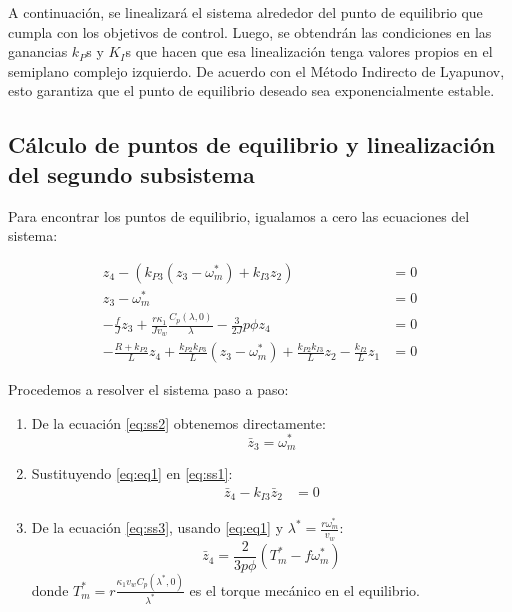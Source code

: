 {A continuación, se linealizará el sistema alrededor del punto de equilibrio que cumpla con los objetivos 
de control. Luego, se obtendrán las condiciones en las ganancias $k_{P}$s y $K_I$s que hacen que esa 
linealización tenga valores propios en el semiplano complejo izquierdo. De acuerdo con el Método Indirecto 
de Lyapunov, esto garantiza que el punto de equilibrio deseado sea exponencialmente estable.

\subsection{Cálculo de puntos de equilibrio y linealización del segundo subsistema}
Para encontrar los puntos de equilibrio, igualamos a cero las ecuaciones del sistema:

\begin{align}
z_4 - (k_{P3}(z_3 - \omega^*_m) + k_{I3}z_2) &= 0 \label{eq:ss1} \\
z_3 - \omega^*_m &= 0 \label{eq:ss2} \\
-\frac{f}{J}z_3 + \frac{r\kappa_1}{Jv_w}\frac{C_p(\lambda, 0)}{\lambda} - \frac{3}{2J}p\phi z_4 &= 0 \label{eq:ss3} \\
-\frac{R+k_{P2}}{L}z_4 + \frac{k_{P2}k_{P3}}{L}(z_3 - \omega^*_m) + \frac{k_{P2}k_{I3}}{L}z_2 - \frac{k_{I2}}{L}z_1 &= 0 \label{eq:ss4}
\end{align}

Procedemos a resolver el sistema paso a paso:

\begin{enumerate}
\item De la ecuación \eqref{eq:ss2} obtenemos directamente:
\begin{equation}
\bar{z}_3 = \omega^*_m \label{eq:eq1}
\end{equation}

\item Sustituyendo \eqref{eq:eq1} en \eqref{eq:ss1}:
\begin{align}
\bar{z}_4 - k_{I3}\bar{z}_2 &= 0 \label{eq:eq2}
\end{align}

\item De la ecuación \eqref{eq:ss3}, usando \eqref{eq:eq1} y $\lambda^* = \frac{r\omega^*_m}{v_w}$:
\begin{equation}
\bar{z}_4 = \frac{2}{3p\phi}(T^*_m - f\omega^*_m) \label{eq:eq3}
\end{equation}
donde $T^*_m = r\frac{\kappa_1 v_w C_p(\lambda^*, 0)}{\lambda^*}$ es el torque mecánico en el equilibrio.


\end{enumerate}}
